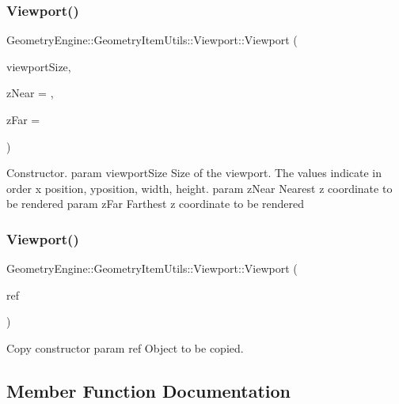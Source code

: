 \subsubsection{\texorpdfstring{Viewport()}{Viewport()}\hspace{0.1cm}{\footnotesize\ttfamily [1/2]}}
{\footnotesize\ttfamily Geometry\+Engine\+::\+Geometry\+Item\+Utils\+::\+Viewport\+::\+Viewport (\begin{DoxyParamCaption}\item[{const Q\+Vector4D \&}]{viewport\+Size,  }\item[{G\+Ldouble}]{z\+Near = {},  }\item[{G\+Ldouble}]{z\+Far = {} }\end{DoxyParamCaption})}

Constructor. param viewport\+Size Size of the viewport. The values indicate in order x position, yposition, width, height. param z\+Near Nearest z coordinate to be rendered param z\+Far Farthest z coordinate to be rendered \mbox{\label{class_geometry_engine_1_1_geometry_item_utils_1_1_viewport_a77455d64d5b6fec118f95438aff987c2}} 
\subsubsection{\texorpdfstring{Viewport()}{Viewport()}\hspace{0.1cm}{\footnotesize\ttfamily [2/2]}}
{\footnotesize\ttfamily Geometry\+Engine\+::\+Geometry\+Item\+Utils\+::\+Viewport\+::\+Viewport (\begin{DoxyParamCaption}\item[{const \mbox{\hyperlink{class_geometry_engine_1_1_geometry_item_utils_1_1_viewport}{Viewport}} \&}]{ref }\end{DoxyParamCaption})}

Copy constructor param ref Object to be copied. 

\subsection{Member Function Documentation}
\mbox{\label{class_geometry_engine_1_1_geometry_item_utils_1_1_viewport_a8bd47866a001eae03f88df67fd699904}} 
